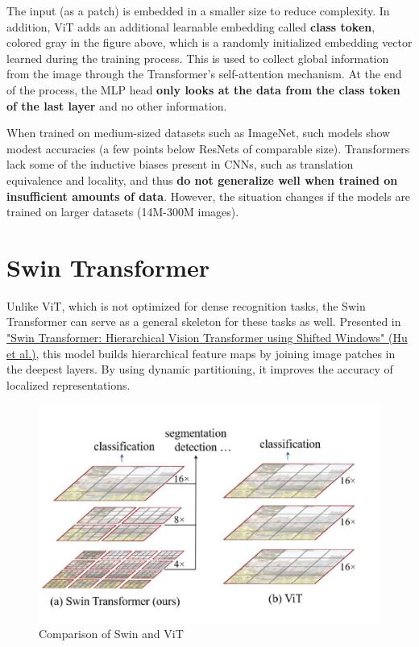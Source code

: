 The input (as a patch) is embedded in a smaller size to reduce complexity. In addition, ViT adds an additional learnable embedding called \textbf{class token}, colored gray in the figure above, which is a randomly initialized embedding vector learned during the training process. This is used to collect global information from the image through the Transformer's self-attention mechanism. At the end of the process, the MLP head \textbf{only looks at the data from the class token of the last layer} and no other information.

When trained on medium-sized datasets such as ImageNet, such models show modest accuracies (a few points below ResNets of comparable size). Transformers lack some of the inductive biases present in CNNs, such as translation equivalence and locality, and thus \textbf{do not generalize well when trained on insufficient amounts of data}. However, the situation changes if the models are trained on larger datasets (14M-300M images).

\section{Swin Transformer}

Unlike ViT, which is not optimized for dense recognition tasks, the Swin Transformer can serve as a general skeleton for these tasks as well. Presented in \href{https://arxiv.org/pdf/2103.14030}{"Swin Transformer: Hierarchical Vision Transformer using Shifted Windows" (Hu et al.)}, this model builds hierarchical feature maps by joining image patches in the deepest layers. By using dynamic partitioning, it improves the accuracy of localized representations. 

\begin{figure}[!htbp]
    \centering
    \includegraphics[width=0.85\linewidth]{tikz/chapter8 - Swin Transformer.png}
    \caption{{} Comparison of Swin and ViT}
\end{figure}


